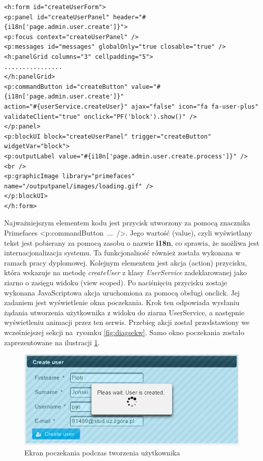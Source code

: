 \begin{lstlisting}[caption={Kod formularza tworzenia użytkownika}, label=lis:kod_form_tworzenia_uzyt, numbers=none]
<h:form id="createUserForm">
<p:panel id="createUserPanel" header="#{i18n['page.admin.user.create']}">
<p:focus context="createUserPanel" />
<p:messages id="messages" globalOnly="true closable="true" />
<h:panelGrid columns="3" cellpadding="5">
................
</h:panelGrid>
<p:commandButton id="createButton" value="#{i18n['page.admin.user.create']}"
action="#{userService.createUser}" ajax="false" icon="fa fa-user-plus"
validateClient="true" onclick="PF('block').show()" />
</p:panel>
<p:blockUI block="createUserPanel" trigger="createButton" widgetVar="block">
<p:outputLabel value="#{i18n['page.admin.user.create.process']}" />
<br />
<p:graphicImage library="primefaces" name="/outputpanel/images/loading.gif" />
</p:blockUI>
</h:form>\end{lstlisting}

Najważniejszym elementem kodu jest przycisk utworzony za pomocą znacznika Primefaces <p:commandButton~...~/>. Jego wartość (value), czyli wyświetlany tekst jest pobierany za pomocą zasobu o nazwie \textbf{i18n}, co sprawia, że możliwa jest internacjonalizacja systemu. Ta funkcjonalność również została wykonana w ramach pracy dyplomowej. Kolejnym elementem jest akcja (action) przycisku, która wskazuje na metodę \textit{createUser} z klasy \textit{UserService} zadeklarowanej jako ziarno o zasięgu widoku (view scoped). Po naciśnięciu przycisku zostaje wykonana JavaScriptowa akcja uruchomiona za pomocą obsługi onclick. Jej zadaniem jest wyświetlenie okna poczekania. Krok ten odpowiada wysłaniu żądania utworzenia użytkownika z widoku do ziarna UserService, a następnie wyświetleniu animacji przez ten serwis. Przebieg akcji został przedstawiony we wcześniejszej sekcji na~rysunku \ref{fig:diagsekw}. Samo okno poczekania zostało zaprezentowane na ilustracji \ref{fig:user-czekanie}. 
\begin{figure}[h!]
	\centering
	\includegraphics[width=15cm]{rysunki/user-czekanie.png}	
	\caption{Ekran poczekania podczas tworzenia użytkownika}
	\label{fig:user-czekanie}
\end{figure}

